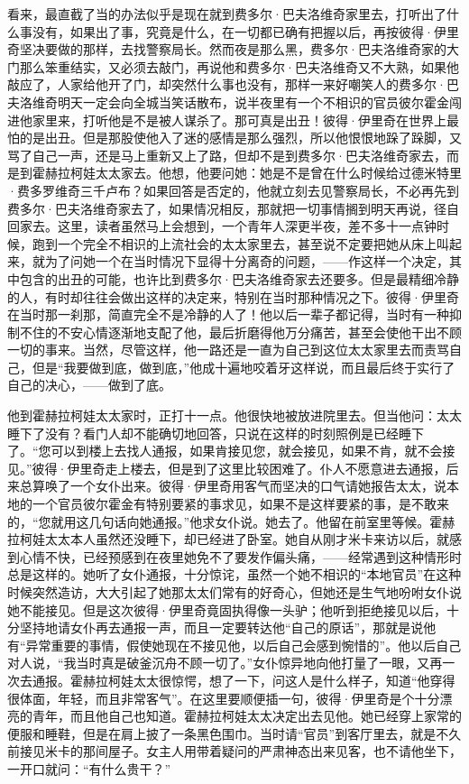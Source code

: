 \par 看来，最直截了当的办法似乎是现在就到费多尔·巴夫洛维奇家里去，打听出了什么事没有，如果出了事，究竟是什么，在一切都已确有把握以后，再按彼得·伊里奇坚决要做的那样，去找警察局长。然而夜是那么黑，费多尔·巴夫洛维奇家的大门那么笨重结实，又必须去敲门，再说他和费多尔·巴夫洛维奇又不大熟，如果他敲应了，人家给他开了门，却突然什么事也没有，那样一来好嘲笑人的费多尔·巴夫洛维奇明天一定会向全城当笑话散布，说半夜里有一个不相识的官员彼尔霍金闯进他家里来，打听他是不是被人谋杀了。那可真是出丑！彼得·伊里奇在世界上最怕的是出丑。但是那股使他入了迷的感情是那么强烈，所以他恨恨地跺了跺脚，又骂了自己一声，还是马上重新又上了路，但却不是到费多尔·巴夫洛维奇家去，而是到霍赫拉柯娃太太家去。他想，他要问她：她是不是曾在什么时候给过德米特里·费多罗维奇三千卢布？如果回答是否定的，他就立刻去见警察局长，不必再先到费多尔·巴夫洛维奇家去了，如果情况相反，那就把一切事情搁到明天再说，径自回家去。这里，读者虽然马上会想到，一个青年人深更半夜，差不多十一点钟时候，跑到一个完全不相识的上流社会的太太家里去，甚至说不定要把她从床上叫起来，就为了问她一个在当时情况下显得十分离奇的问题，——作这样一个决定，其中包含的出丑的可能，也许比到费多尔·巴夫洛维奇家去还要多。但是最精细冷静的人，有时却往往会做出这样的决定来，特别在当时那种情况之下。彼得·伊里奇在当时那一刹那，简直完全不是冷静的人了！他以后一辈子都记得，当时有一种抑制不住的不安心情逐渐地支配了他，最后折磨得他万分痛苦，甚至会使他干出不顾一切的事来。当然，尽管这样，他一路还是一直为自己到这位太太家里去而责骂自己，但是“我要做到底，做到底，”他成十遍地咬着牙这样说，而且最后终于实行了自己的决心，——做到了底。
\par 他到霍赫拉柯娃太太家时，正打十一点。他很快地被放进院里去。但当他问：太太睡下了没有？看门人却不能确切地回答，只说在这样的时刻照例是已经睡下了。“您可以到楼上去找人通报，如果肯接见您，就会接见，如果不肯，就不会接见。”彼得·伊里奇走上楼去，但是到了这里比较困难了。仆人不愿意进去通报，后来总算唤了一个女仆出来。彼得·伊里奇用客气而坚决的口气请她报告太太，说本地的一个官员彼尔霍金有特别要紧的事求见，如果不是这样要紧的事，是不敢来的，“您就用这几句话向她通报。”他求女仆说。她去了。他留在前室里等候。霍赫拉柯娃太太本人虽然还没睡下，却已经进了卧室。她自从刚才米卡来访以后，就感到心情不快，已经预感到在夜里她免不了要发作偏头痛，——经常遇到这种情形时总是这样的。她听了女仆通报，十分惊诧，虽然一个她不相识的“本地官员”在这种时候突然造访，大大引起了她那太太们常有的好奇心，但她还是生气地吩咐女仆说她不能接见。但是这次彼得·伊里奇竟固执得像一头驴；他听到拒绝接见以后，十分坚持地请女仆再去通报一声，而且一定要转达他“自己的原话”，那就是说他有“异常重要的事情，假使她现在不接见他，以后自己会感到惋惜的”。他以后自己对人说，“我当时真是破釜沉舟不顾一切了。”女仆惊异地向他打量了一眼，又再一次去通报。霍赫拉柯娃太太很惊愕，想了一下，问这人是什么样子，知道“他穿得很体面，年轻，而且非常客气”。在这里要顺便插一句，彼得·伊里奇是个十分漂亮的青年，而且他自己也知道。霍赫拉柯娃太太决定出去见他。她已经穿上家常的便服和睡鞋，但是在肩上披了一条黑色围巾。当时请“官员”到客厅里去，就是不久前接见米卡的那间屋子。女主人用带着疑问的严肃神态出来见客，也不请他坐下，一开口就问：“有什么贵干？”

